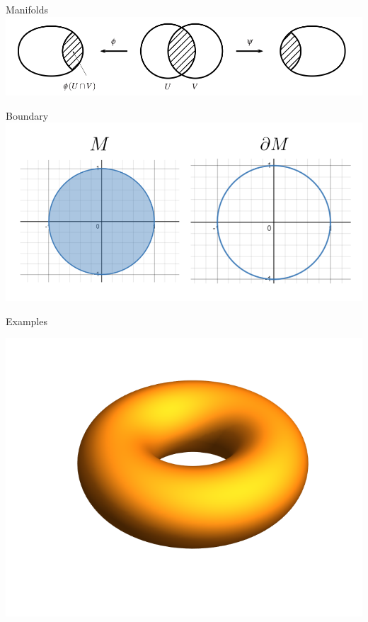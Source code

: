 \documentclass[9pt]{beamer}
\begin{document}
\begin{frame}{Manifolds}
    \includegraphics[scale=0.55]{compatible.PNG}

\end{frame}

\begin{frame}{Boundary}
    \includegraphics[scale=0.6]{boundary.PNG}
\end{frame}

\begin{frame}{Examples}
    \begin{center}  
    \includegraphics[scale=0.5]{torus.png}
    \end{center}
\end{frame}
\end{document}
